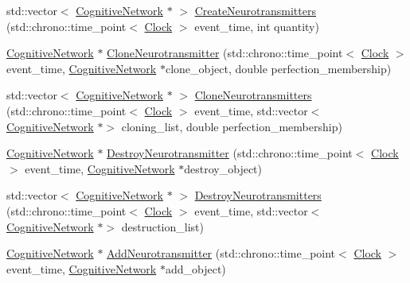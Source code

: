 \begin{DoxyCompactItemize}
\item 
std\+::vector$<$ \mbox{\hyperlink{classCognitiveNetwork}{Cognitive\+Network}} $\ast$ $>$ \mbox{\hyperlink{classSynapse_a593c70925fb80b880c6a01f2f252eb22}{Create\+Neurotransmitters}} (std\+::chrono\+::time\+\_\+point$<$ \mbox{\hyperlink{universe_8h_a0ef8d951d1ca5ab3cfaf7ab4c7a6fd80}{Clock}} $>$ event\+\_\+time, int quantity)
\item 
\mbox{\hyperlink{classCognitiveNetwork}{Cognitive\+Network}} $\ast$ \mbox{\hyperlink{classSynapse_a1b52aa12cc7c28bfa2564e21ac17eb07}{Clone\+Neurotransmitter}} (std\+::chrono\+::time\+\_\+point$<$ \mbox{\hyperlink{universe_8h_a0ef8d951d1ca5ab3cfaf7ab4c7a6fd80}{Clock}} $>$ event\+\_\+time, \mbox{\hyperlink{classCognitiveNetwork}{Cognitive\+Network}} $\ast$clone\+\_\+object, double perfection\+\_\+membership)
\item 
std\+::vector$<$ \mbox{\hyperlink{classCognitiveNetwork}{Cognitive\+Network}} $\ast$ $>$ \mbox{\hyperlink{classSynapse_a97c0db103754d337e28591f185c8379f}{Clone\+Neurotransmitters}} (std\+::chrono\+::time\+\_\+point$<$ \mbox{\hyperlink{universe_8h_a0ef8d951d1ca5ab3cfaf7ab4c7a6fd80}{Clock}} $>$ event\+\_\+time, std\+::vector$<$ \mbox{\hyperlink{classCognitiveNetwork}{Cognitive\+Network}} $\ast$$>$ cloning\+\_\+list, double perfection\+\_\+membership)
\item 
\mbox{\hyperlink{classCognitiveNetwork}{Cognitive\+Network}} $\ast$ \mbox{\hyperlink{classSynapse_a8d53488bdd8f0bd97216e5d388df35b8}{Destroy\+Neurotransmitter}} (std\+::chrono\+::time\+\_\+point$<$ \mbox{\hyperlink{universe_8h_a0ef8d951d1ca5ab3cfaf7ab4c7a6fd80}{Clock}} $>$ event\+\_\+time, \mbox{\hyperlink{classCognitiveNetwork}{Cognitive\+Network}} $\ast$destroy\+\_\+object)
\item 
std\+::vector$<$ \mbox{\hyperlink{classCognitiveNetwork}{Cognitive\+Network}} $\ast$ $>$ \mbox{\hyperlink{classSynapse_a58c882f356bc34c66a7cd2b345532ec9}{Destroy\+Neurotransmitters}} (std\+::chrono\+::time\+\_\+point$<$ \mbox{\hyperlink{universe_8h_a0ef8d951d1ca5ab3cfaf7ab4c7a6fd80}{Clock}} $>$ event\+\_\+time, std\+::vector$<$ \mbox{\hyperlink{classCognitiveNetwork}{Cognitive\+Network}} $\ast$$>$ destruction\+\_\+list)
\item 
\mbox{\hyperlink{classCognitiveNetwork}{Cognitive\+Network}} $\ast$ \mbox{\hyperlink{classSynapse_a76b96e3f71f9e7b0ba6b80166c3883f7}{Add\+Neurotransmitter}} (std\+::chrono\+::time\+\_\+point$<$ \mbox{\hyperlink{universe_8h_a0ef8d951d1ca5ab3cfaf7ab4c7a6fd80}{Clock}} $>$ event\+\_\+time, \mbox{\hyperlink{classCognitiveNetwork}{Cognitive\+Network}} $\ast$add\+\_\+object)

\end{DoxyCompactItemize}
